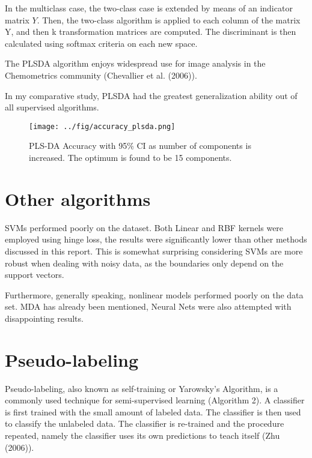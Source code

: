 \documentclass[conference,final,]{IEEEtran}
\makeatletter
\def\maxwidth{\ifdim\Gin@nat@width>\linewidth\linewidth
\else\Gin@nat@width\fi}
\let\Oldincludegraphics\includegraphics
\renewcommand{\includegraphics}[1]{\Oldincludegraphics[width=\maxwidth]{#1}}
\makeatother
\begin{document}
In the multiclass case, the two-class case is extended by means of an
indicator matrix \(Y\). Then, the two-class algorithm is applied to each
column of the matrix Y, and then k transformation matrices are computed.
The discriminant is then calculated using softmax criteria on each new
space.

The PLSDA algorithm enjoys widespread use for image analysis in the
Chemometrics community (Chevallier et al. (2006)).

In my comparative study, PLSDA had the greatest generalization ability
out of all supervised algorithms.

\begin{figure}
\centering
\texttt{[image: ../fig/accuracy\_plsda.png]}
\caption{PLS-DA Accuracy with 95\% CI as number of components is
increased. The optimum is found to be 15 components.}
\end{figure}

\hypertarget{other-algorithms}{%
\section{Other algorithms}\label{other-algorithms}}

SVMs performed poorly on the dataset. Both Linear and RBF kernels were
employed using hinge loss, the results were significantly lower than
other methods discussed in this report. This is somewhat surprising
considering SVMs are more robust when dealing with noisy data, as the
boundaries only depend on the support vectors.

Furthermore, generally speaking, nonlinear models performed poorly on
the data set. MDA has already been mentioned, Neural Nets were also
attempted with disappointing results.

\hypertarget{pseudo-labeling}{%
\section{Pseudo-labeling}\label{pseudo-labeling}}

Pseudo-labeling, also known as self-training or Yarowsky's Algorithm, is
a commonly used technique for semi-supervised learning (Algorithm 2). A
classifier is first trained with the small amount of labeled data. The
classifier is then used to classify the unlabeled data. The classifier
is re-trained and the procedure repeated, namely the classifier uses its
own predictions to teach itself (Zhu (2006)).
\end{document}
